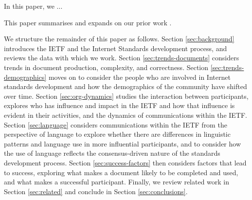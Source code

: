 \documentclass[twocolumn,10pt]{article}
\begin{document}




In this paper, we ...



This paper summarises and expands on our prior work
\cite{mcquistin:2021:characterising,khare:2022:web-we-weave,
healey:2023:power,mcquistin:2023:errare,khare:2023:tracing,
karan:2023:leda,healey:2023:power-frontiers,barnes:2024:temporal}.


We structure the remainder of this paper as follows.
Section \ref{sec:background} introduces the IETF and the Internet Standards
development process, and reviews the data with which we work.
Section \ref{sec:trends-documents} considers trends in document production,
complexity, and correctness.
Section \ref{sec:trends-demographics} moves on to consider the people who
are involved in Internet standards development and how the demographics of
the community have shifted over time.
Section \ref{sec:org-dynamics} studies the interaction between participants,
explores who has influence and impact in the IETF and how that influence
is evident in their activities, and the dynamics of communications within
the IETF.
Section \ref{sec:language} considers communications within the IETF from
the perspective of language to explore whether there are differences in
linguistic patterns and language use in more influential participants,
and to consider how the use of language reflects the consensus-driven
nature of the standards development process.
Section \ref{sec:success-factors} then considers factors that lead to
success, exploring what makes a document likely to be completed and
used, and what makes a successful participant.
Finally, we review related work in Section \ref{sec:related} and conclude
in Section \ref{sec:conclusions}.
\end{document}

